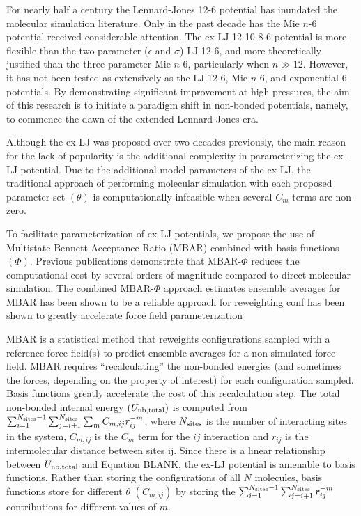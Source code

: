 \documentclass[11pt,a4paper]{article}
\begin{document}
For nearly half a century the Lennard-Jones 12-6 potential has inundated the molecular simulation literature. Only in the past decade has the Mie $n$-6 potential received considerable attention. The ex-LJ 12-10-8-6 potential is more flexible than the two-parameter ($\epsilon$ and $\sigma$) LJ 12-6, and more theoretically justified than the three-parameter Mie $n$-6, particularly when $n \gg 12$. However, it has not been tested as extensively as the LJ 12-6, Mie $n$-6, and exponential-6 potentials. By demonstrating significant improvement at high pressures, the aim of this research is to initiate a paradigm shift in non-bonded potentials, namely, to commence the dawn of the extended Lennard-Jones era.

Although the ex-LJ was proposed over two decades previously, the main reason for the lack of popularity is the additional complexity in parameterizing the ex-LJ potential. Due to the additional model parameters of the ex-LJ, the traditional approach of performing molecular simulation with each proposed parameter set $(\theta)$ is computationally infeasible when several $C_m$ terms are non-zero.

To facilitate parameterization of ex-LJ potentials, we propose the use of Multistate Bennett Acceptance Ratio (MBAR) combined with basis functions $(\Phi)$. Previous publications demonstrate that MBAR-$\Phi$ reduces the computational cost by several orders of magnitude compared to direct molecular simulation. The combined MBAR-$\Phi$ approach estimates ensemble averages for MBAR has been shown to be a reliable approach for reweighting conf has been shown to greatly accelerate force field parameterization

MBAR is a statistical method that reweights configurations sampled with a reference force field(s) to predict ensemble averages for a non-simulated force field. MBAR requires ``recalculating'' the non-bonded energies (and sometimes the forces, depending on the property of interest) for each configuration sampled. Basis functions greatly accelerate the cost of this recalculation step. The total non-bonded internal energy $(U_{\rm nb, total})$ is computed from $\sum_{i=1}^{N_{\rm sites}-1} \sum_{j=i+1}^{N_{\rm sites}} \sum_m C_{m,ij} r_{ij}^{-m}$, where $N_{\rm sites}$ is the number of interacting sites in the system, $C_{m,ij}$ is the $C_{m}$ term for the $ij$ interaction and $r_{ij}$ is the intermolecular distance between sites ij. Since there is a linear relationship between $U_{\rm nb, total}$ and Equation BLANK, the ex-LJ potential is amenable to basis functions. Rather than storing the configurations of all $N$ molecules, basis functions store  for different $\theta$ $(C_{m,ij})$ by storing the $\sum_{i=1}^{N_{\rm sites}-1} \sum_{j=i+1}^{N_{\rm sites}} r_{ij}^{-m}$ contributions for different values of $m$. 
\end{document}
